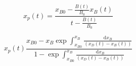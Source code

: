 \begin{equation}\label{eq16}
x_{p}(t) = \frac{ x_{B0} - \frac{B(t)}{B_{0}} x_{B}(t) }{t - \frac{B(t)}{B_{0}}}
\end{equation}

\begin{equation}\label{eq17}
x_{p}(t) \frac{ x_{B0} - x_{B} \exp \int_{x_{B0}}^{x_{B}} \frac{\mathrm{d} x_{B}}{(x_{D}(t) - x_{B}(t))}}{1 -  \exp \int_{x_{B0}}^{x_{B}} \frac{\mathrm{d} x_{B}}{(x_{D}(t) - x_{B}(t))}}
\end{equation}






